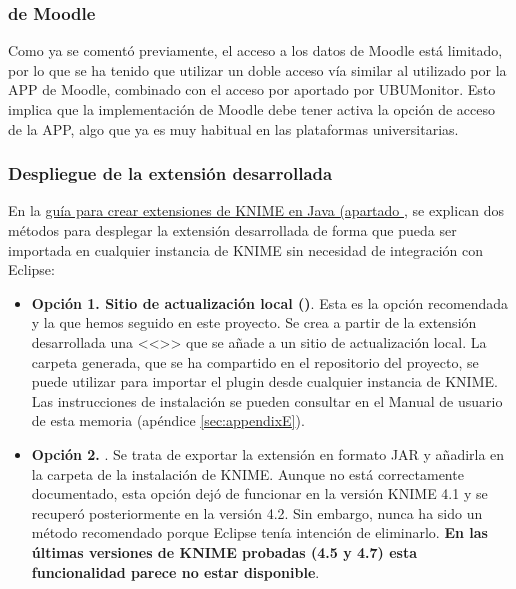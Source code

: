 \subsubsection{ de Moodle}

Como ya se comentó previamente, el acceso a los datos de Moodle está limitado, por lo que se ha tenido que utilizar 
un doble acceso vía  similar al utilizado por la APP de Moodle, combinado con el acceso por  aportado 
por UBUMonitor. Esto implica que la implementación de Moodle debe tener activa la opción de acceso de la APP, algo que ya es muy 
habitual en las plataformas universitarias. 


\subsubsection{Despliegue de la extensión desarrollada}

En la \href{https://docs.knime.com/latest/analytics_platform_new_node_quickstart_guide/index.html\#_deploy_your_extension}{guía para crear extensiones de KNIME en Java (apartado }, se explican dos métodos para desplegar la extensión 
desarrollada de forma que pueda ser importada en cualquier instancia de KNIME sin necesidad de integración
con Eclipse: 

\begin{itemize}
	\item \textbf{Opción 1. Sitio de actualización local  ()}. Esta es la opción recomendada y la que hemos 
	seguido en este proyecto. Se crea a partir de la extensión
	desarrollada una <<>> que se añade a un sitio de actualización local. La carpeta generada, que se ha compartido 
	en el repositorio del proyecto, se puede utilizar para importar el plugin desde cualquier instancia de KNIME. Las instrucciones de 
	instalación se pueden consultar en el Manual de usuario de esta memoria (apéndice \ref{sec:appendixE}). 
	\item \textbf{Opción 2. }. Se trata de exportar la extensión en formato JAR y añadirla en la carpeta  
	de la instalación de KNIME. Aunque no está correctamente documentado, esta opción dejó de funcionar en la versión KNIME 4.1 y 
	se recuperó posteriormente en la versión 4.2. Sin embargo, nunca ha sido un método recomendado porque Eclipse tenía intención de eliminarlo. 
	\textbf{En las últimas versiones de KNIME probadas (4.5 y 4.7) esta funcionalidad parece no estar disponible}. 
\end{itemize}


